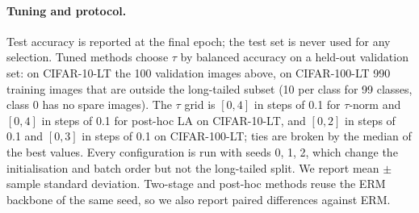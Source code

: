 \paragraph{Tuning and protocol.} Test accuracy is reported at the final epoch; the test set is never used for any selection.
Tuned methods choose $\tau$ by balanced accuracy on a held-out validation set: on CIFAR-10-LT the 100 validation images above,
on CIFAR-100-LT 990 training images that are outside the long-tailed subset (10 per class for 99 classes, class 0 has no spare images).
The $\tau$ grid is $[0,4]$ in steps of 0.1 for $\tau$-norm and $[0,4]$ in steps of 0.1 for post-hoc LA on CIFAR-10-LT, and
$[0,2]$ in steps of 0.1 and $[0,3]$ in steps of 0.1 on CIFAR-100-LT; ties are broken by the median of the best values.
Every configuration is run with seeds 0, 1, 2, which change the initialisation and batch order but not the long-tailed split.
We report mean $\pm$ sample standard deviation. Two-stage and post-hoc methods reuse the ERM backbone of the same seed, so we also report
paired differences against ERM.
